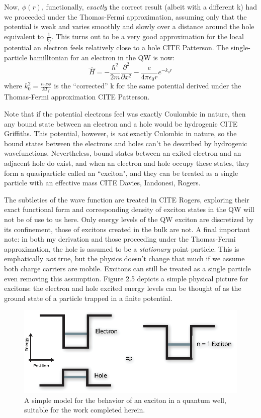 \indent Now, $\phi(r)$, functionally, \textit{exactly} the correct result (albeit with a different k) had we proceeded under the Thomas-Fermi approximation, assuming only that the potential is weak and varies smoothly and slowly over a distance around the hole equivalent to $\frac{1}{k_f}$. This turns out to be a very good approximation for the local potential an electron feels relatively close to a hole CITE Patterson. The single-particle hamilltonian for an electron in the QW is now:
\begin{equation}
\hat{H} = - \frac{\hbar^2}{2m} \frac{\partial^2}{\partial x^2} - \frac{e}{4\pi \epsilon_0 r} e^{-k_0 r}
\end{equation}
where $k_0^2 = \frac{n_0 e\phi}{k T_f}$ is the ``corrected'' k for the same potential derived under the Thomas-Fermi approximation CITE Patterson. 

\indent Note that if the potential electrons feel was exactly Coulombic in nature, then any bound state between an electron and a hole would be hydrogenic CITE Griffiths. This potential, however, is \textit{not} exactly Culombic in nature, so the bound states between the electrons and holes can't be described by hydrogenic wavefunctions. Nevertheless, bound states between an exited electron and an adjacent hole do exist, and when an electron and hole occupy these states, they form a quasiparticle called an ``exciton", and they can be treated as a single particle with an effective mass CITE Davies, Iandonesi, Rogers.

\indent The subtleties of the wave function are treated in CITE Rogers, exploring their exact functional form and corresponding density of exciton states in the QW will not be of use to us here. Only energy levels of the QW exciton are discretized by its confinement, those of excitons created in the bulk are not. A final important note: in both my derivation and those proceeding under the Thomas-Fermi approximation, the hole is assumed to be a \textit{stationary} point particle. This is emphatically \textit{not} true, but the physics doesn't change that much if we assume both charge carriers are mobile. Excitons can still be treated as a single particle even removing this assumption. Figure 2.5 depicts a simple physical picture for excitons: the electron and hole excited energy levels can be thought of as the ground state of a particle trapped in a finite potential.  

\begin{figure}[h!]
\label{Spapprox}
\centering
\includegraphics[width = .7\textwidth]{SpApprox.eps}
\caption{\doublespacing A simple model for the behavior of an exciton in a quantum well, suitable for the work completed herein.}
\label{GaAsBstruct}
\end{figure}


